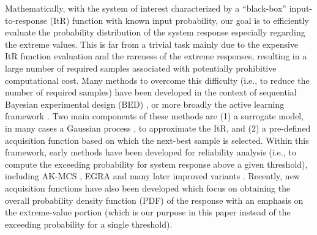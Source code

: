 \documentclass[11pt]{article}
\begin{document}
Mathematically, with the system of interest characterized by a ``black-box'' input-to-response (ItR) function with known input probability, our goal is to efficiently evaluate the probability distribution of the system response especially regarding the extreme values. This is far from a trivial task mainly due to the expensive ItR function evaluation and the rareness of the extreme responses, resulting in a large number of required samples associated with potentially prohibitive computational cost. Many methods to overcome this difficulty (i.e., to reduce the number of required samples) have been developed in the context of sequential Bayesian experimental design (BED) 
\cite{chaloner1995bayesian}, or more broadly the active learning framework \cite{cohn1996active}. Two main components of these methods are  (1) a surrogate model, in many cases a Gaussian process \cite{rasmussen2003gaussian}, to approximate the ItR, and (2) a pre-defined acquisition function based on which the next-best sample is selected. Within this framework, early methods have been developed for reliability analysis (i.e., to compute the exceeding probability for system response above a given threshold), including AK-MCS \cite{echard2011ak}, EGRA \cite{bichon2008efficient} and many later improved variants \cite{hu2016global, wang2016gaussian,sun2017lif}. Recently, new acquisition functions \cite{mohamad2018sequential, gong2021full,sapsis2020output,blanchard2021bayesian} have also been developed which focus on obtaining the overall probability density function (PDF) of the response with an emphasis on the extreme-value portion (which is our purpose in this paper instead of the exceeding probability for a single threshold).  
\end{document}
